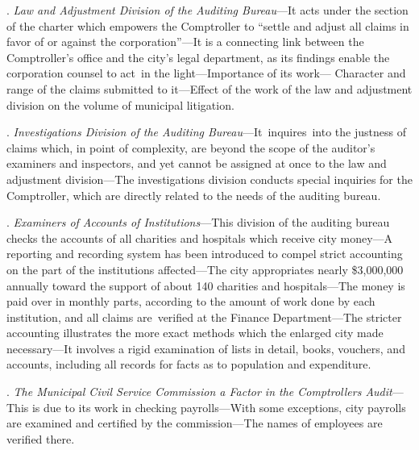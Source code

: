 \documentclass[openany,nobib]{tufte-book}
\begin{document}
\vspace{.15in}

.\emph{ Law and Adjustment Division of the Auditing Bureau}---It acts
under the section of the charter which empowers the Comptroller to
``settle and adjust all claims in favor of or against the
corporation''---It is a connecting link between the Comptroller's office
and the city's legal department, as its findings enable the corporation
counsel to act~in the light---Importance of its work--- Character and
range of the claims submitted to it---Effect of the work of the law and
adjustment division on the volume of municipal litigation.~

. \emph{Investigations Division of the Auditing
Bureau}---It~inquires~into the justness of claims which, in point of
complexity, are beyond the scope of the auditor's examiners and
inspectors, and yet cannot be assigned at once to the law and adjustment
division---The investigations division conducts special inquiries for
the Comptroller, which are directly related to the needs of the auditing
bureau.~

\vspace{.15in}

. \emph{Examiners of Accounts of Institutions}---This division of the
auditing bureau checks the accounts of all charities and hospitals which
receive city money---A reporting and recording system has been
introduced to compel strict accounting on the part of the institutions
affected---The city appropriates nearly \$3,000,000 annually toward the
support of about 140 charities and hospitals---The money is paid over in
monthly parts, according to the amount of work done by each institution,
and all claims are~verified at the Finance Department---The stricter
accounting illustrates the more exact methods which the enlarged city
made necessary---It involves a rigid examination of lists in detail,
books, vouchers, and accounts, including all records for facts as to
population and expenditure.~

\vspace{.15in}

.\emph{ The Municipal Civil Service Commission a Factor in the
Comptroller\textquotesingle s Audit}---This is due to its work in
checking payrolls---With some exceptions, city payrolls are examined and
certified by the commission---The names of employees are verified there.

\vspace{.15in}
\end{document}
